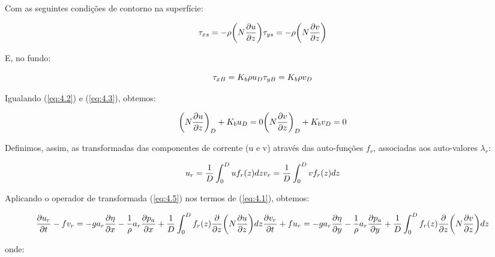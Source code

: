 \documentclass[11pt]{article}
\begin{document}
Com as seguintes condições de contorno na superfície:

\begin{equation}
    \tau_{xs} = -\rho\bigg( N\frac{\partial{u}}{\partial{z}} \bigg)
    \\
    \tau_{ys} = -\rho\bigg( N\frac{\partial{v}}{\partial{z}} \bigg)
    \label{eq:4.2}
\end{equation}

E, no fundo:

\begin{equation}
    \tau_{xB} = K_b\rho u_D
    \\
    \tau_{yB} = K_b\rho v_ D
    \label{eq:4.3}
\end{equation}

Igualando (\ref{eq:4.2}) e (\ref{eq:4.3}), obtemos:

\begin{equation}
    \bigg( N\frac{\partial{u}}{\partial{z}} \bigg)_D + K_b u_D = 0
    \\
    \bigg( N\frac{\partial{v}}{\partial{z}} \bigg)_D + K_b v_ D = 0
    \label{eq:4.4}
\end{equation}

Definimos, assim, as transformadas das componentes de corrente (u e v)
através das auto-funções \(f_r\), associadas aos auto-valores
\(\lambda_r\):

\begin{equation}
    u_r = \frac{1}{D}\int^{D}_{0}u f_r(z) dz
    \\
    v_r = \frac{1}{D}\int^{D}_{0}v f_r(z) dz
    \label{eq:4.5}
\end{equation}

Aplicando o operador de transformada (\ref{eq:4.5}) nos termos de
(\ref{eq:4.1}), obtemos:

\begin{equation}
    \frac{\partial{u_r}}{\partial{t}} - fv_r = -ga_r\frac{\partial{\eta}}{\partial{x}} - \frac{1}{\rho}a_r\frac{\partial{p_a}}{\partial{x}} + \frac{1}{D}\int^{D}_{0}f_r(z)\frac{\partial}{\partial{z}}\bigg( N\frac{\partial{u}}{\partial{z}} \bigg)dz
    \\
    \frac{\partial{v_r}}{\partial{t}} + fu_r = -ga_r\frac{\partial{\eta}}{\partial{y}} - \frac{1}{\rho}a_r\frac{\partial{p_a}}{\partial{y}} + \frac{1}{D}\int^{D}_{0}f_r(z)\frac{\partial}{\partial{z}}\bigg( N\frac{\partial{v}}{\partial{z}} \bigg)dz
    \label{eq:4.6}
\end{equation}

onde:
\end{document}
